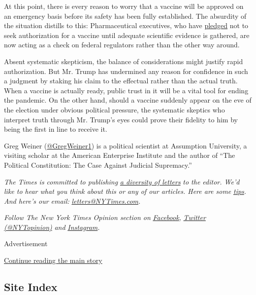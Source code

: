 At this point, there is every reason to worry that a vaccine will be
approved on an emergency basis before its safety has been fully
established. The absurdity of the situation distills to this:
Pharmaceutical executives, who have
\href{https://www.nytimes3xbfgragh.onion/2020/09/08/health/9-drug-companies-pledge-coronavirus-vaccine.html}{pledged}
not to seek authorization for a vaccine until adequate scientific
evidence is gathered, are now acting as a check on federal regulators
rather than the other way around.

Absent systematic skepticism, the balance of considerations might
justify rapid authorization. But Mr. Trump has undermined any reason for
confidence in such a judgment by staking his claim to the effectual
rather than the actual truth. When a vaccine is actually ready, public
trust in it will be a vital tool for ending the pandemic. On the other
hand, should a vaccine suddenly appear on the eve of the election under
obvious political pressure, the systematic skeptics who interpret truth
through Mr. Trump's eyes could prove their fidelity to him by being the
first in line to receive it.

Greg Weiner (\href{https://twitter.com/GregWeiner1}{@GregWeiner1}) is a
political scientist at Assumption University, a visiting scholar at the
American Enterprise Institute and the author of ``The Political
Constitution: The Case Against Judicial Supremacy.''

\emph{The Times is committed to publishing}
\href{https://www.nytimes3xbfgragh.onion/2019/01/31/opinion/letters/letters-to-editor-new-york-times-women.html}{\emph{a
diversity of letters}} \emph{to the editor. We'd like to hear what you
think about this or any of our articles. Here are some}
\href{https://help.nytimes3xbfgragh.onion/hc/en-us/articles/115014925288-How-to-submit-a-letter-to-the-editor}{\emph{tips}}\emph{.
And here's our email:}
\href{mailto:letters@NYTimes.com}{\emph{letters@NYTimes.com}}\emph{.}

\emph{Follow The New York Times Opinion section on}
\href{https://www.facebookcorewwwi.onion/nytopinion}{\emph{Facebook}}\emph{,}
\href{http://twitter.com/NYTOpinion}{\emph{Twitter (@NYTopinion)}}
\emph{and}
\href{https://www.instagram.com/nytopinion/}{\emph{Instagram}}\emph{.}

Advertisement

\protect\hyperlink{after-bottom}{Continue reading the main story}

\hypertarget{site-index}{%
\subsection{Site Index}\label{site-index}}

